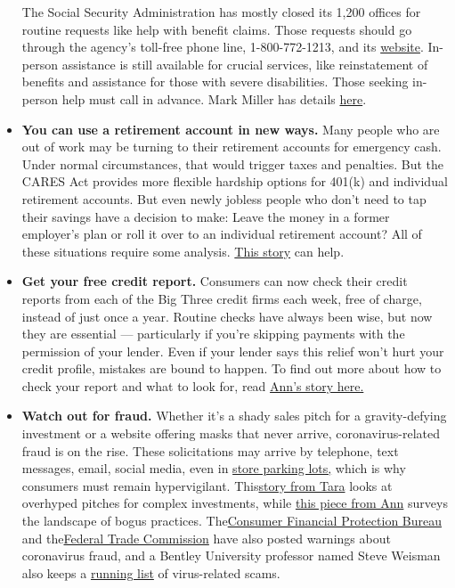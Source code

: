 \begin{itemize}
  The Social Security Administration has mostly closed its 1,200 offices
  for routine requests like help with benefit claims. Those requests
  should go through the agency's toll-free phone line, 1-800-772-1213,
  and its \href{https://www.ssa.gov/onlineservices/}{website}. In-person
  assistance is still available for crucial services, like reinstatement
  of benefits and assistance for those with severe disabilities. Those
  seeking in-person help must call in advance. Mark Miller has details
  \href{https://www.nytimes.com/2020/03/17/business/retirement/coronavirus-social-security.html}{here}.
\item
  \textbf{You can use a retirement account in new ways.} Many people who
  are out of work may be turning to their retirement accounts for
  emergency cash. Under normal circumstances, that would trigger taxes
  and penalties. But the CARES Act provides more flexible hardship
  options for 401(k) and individual retirement accounts. But even newly
  jobless people who don't need to tap their savings have a decision to
  make: Leave the money in a former employer's plan or roll it over to
  an individual retirement account? All of these situations require some
  analysis.
  \href{https://www.nytimes.com/2020/05/10/business/401k-rollover-faq.html}{This
  story} can help.
\item
  \textbf{Get your free credit report.} Consumers can now check their
  credit reports from each of the Big Three credit firms each week, free
  of charge, instead of just once a year. Routine checks have always
  been wise, but now they are essential --- particularly if you're
  skipping payments with the permission of your lender. Even if your
  lender says this relief won't hurt your credit profile, mistakes are
  bound to happen. To find out more about how to check your report and
  what to look for, read
  \href{https://www.nytimes.com/2020/05/15/your-money/coronavirus-credit-reports.html}{Ann's
  story here.}
\item
  \textbf{Watch out for fraud.} Whether it's a shady sales pitch for a
  gravity-defying investment or a website offering masks that never
  arrive, coronavirus-related fraud is on the rise. These solicitations
  may arrive by telephone, text messages, email, social media, even in
  \href{https://www.nytimes.com/2020/04/05/us/politics/coronavirus-scams-fraud-price-gouging.html}{store
  parking lots,} which is why consumers must remain hypervigilant.
  This\href{https://www.nytimes.com/2020/03/13/business/coronavirus-scams.html}{story
  from Tara} looks at overhyped pitches for complex investments, while
  \href{https://www.nytimes.com/2020/04/17/your-money/coronavirus-fraud.html}{this
  piece from Ann} surveys the landscape of bogus practices.
  The\href{https://www.consumerfinance.gov/about-us/blog/beware-coronavirus-related-scams/}{Consumer
  Financial Protection Bureau} and
  the\href{https://www.consumer.ftc.gov/features/coronavirus-scams-what-ftc-doing}{Federal
  Trade Commission} have also posted warnings about coronavirus fraud,
  and a Bentley University professor named Steve Weisman also keeps a
  \href{https://scamicide.com/tag/coronavirus-scams/}{running list} of
  virus-related scams.
\end{itemize}


